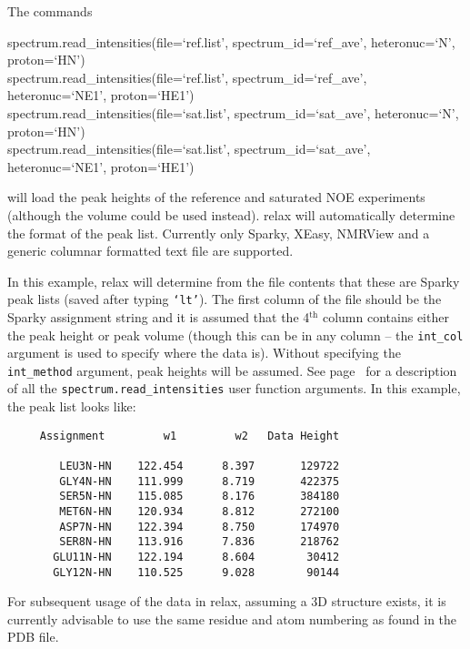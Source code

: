 The commands

\begin{exampleenv}
spectrum.read\_intensities(file=`ref.list', spectrum\_id=`ref\_ave', heteronuc=`N', proton=`HN') \\
spectrum.read\_intensities(file=`ref.list', spectrum\_id=`ref\_ave', heteronuc=`NE1', proton=`HE1') \\
spectrum.read\_intensities(file=`sat.list', spectrum\_id=`sat\_ave', heteronuc=`N', proton=`HN') \\
spectrum.read\_intensities(file=`sat.list', spectrum\_id=`sat\_ave', heteronuc=`NE1', proton=`HE1')
\end{exampleenv}

will load the peak heights of the reference and saturated NOE experiments (although the volume could be used instead).  relax will automatically determine the format of the peak list.  Currently only Sparky, XEasy, NMRView and a generic columnar formatted text file are supported.

In this example, relax will determine from the file contents that these are Sparky peak lists (saved after typing \texttt{`lt'}).  The first column of the file should be the Sparky assignment string and it is assumed that the 4$^\textrm{th}$ column contains either the peak height or peak volume (though this can be in any column -- the \texttt{int\_col} argument is used to specify where the data is).  Without specifying the \texttt{int\_method} argument, peak heights will be assumed.  See page~\pageref{uf: spectrum.read_intensities} for a description of all the \texttt{spectrum.read\_intensities} user function arguments.  In this example, the peak list looks like:

{\footnotesize \begin{verbatim}
     Assignment         w1         w2   Data Height

        LEU3N-HN    122.454      8.397       129722
        GLY4N-HN    111.999      8.719       422375
        SER5N-HN    115.085      8.176       384180
        MET6N-HN    120.934      8.812       272100
        ASP7N-HN    122.394      8.750       174970
        SER8N-HN    113.916      7.836       218762
       GLU11N-HN    122.194      8.604        30412
       GLY12N-HN    110.525      9.028        90144
\end{verbatim}}

For subsequent usage of the data in relax, assuming a 3D structure exists, it is currently advisable to use the same residue and atom numbering as found in the PDB file.

